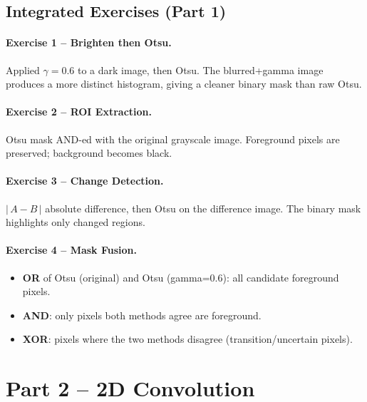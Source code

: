 \documentclass[12pt,a4paper]{article}
\begin{document}
\subsection{Integrated Exercises (Part 1)}

\paragraph{Exercise 1 -- Brighten then Otsu.}
Applied $\gamma = 0.6$ to a dark image, then Otsu. The blurred+gamma image produces
a more distinct histogram, giving a cleaner binary mask than raw Otsu.

\paragraph{Exercise 2 -- ROI Extraction.}
Otsu mask AND-ed with the original grayscale image.  Foreground pixels are
preserved; background becomes black.

\paragraph{Exercise 3 -- Change Detection.}
$|\,A - B\,|$ absolute difference, then Otsu on the difference image.
The binary mask highlights only changed regions.

\paragraph{Exercise 4 -- Mask Fusion.}
\begin{itemize}[leftmargin=*]
  \item \textbf{OR} of Otsu (original) and Otsu (gamma=0.6): all candidate foreground pixels.
  \item \textbf{AND}: only pixels both methods agree are foreground.
  \item \textbf{XOR}: pixels where the two methods disagree (transition/uncertain pixels).
\end{itemize}

\section{Part 2 -- 2D Convolution}
\end{document}
